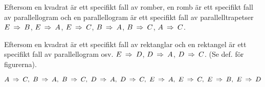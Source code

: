 \begin{task}{1.11}
	Eftersom en kvadrat är ett specifikt fall av romber, en romb är ett specifikt fall av parallellogram och en parallellogram är ett specifikt fall av parallelltrapetser $E \ra B$, $E \ra A$, $E \ra C$, $B \ra A$, $B \ra C$, $A \ra C$.

	Eftersom en kvadrat är ett specifikt fall av rektanglar och en rektangel är ett specifikt fall av parallellogram osv. $E \ra D$, $D \ra A$, $D \ra C$. (Se def. för figurerna).

	\ans $A \ra C,~ B \ra A,~ B \ra C,~ D \ra A,~ D \ra C,~ E \ra A,~ E \ra C,~ E \ra B,~ E \ra D$
\end{task}